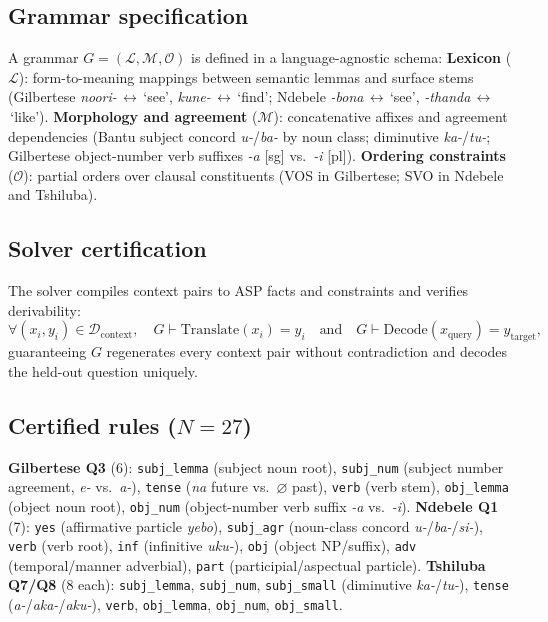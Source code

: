 \documentclass{article}
\begin{document}
\subsection{Grammar specification}
A grammar $G = (\mathcal{L}, \mathcal{M}, \mathcal{O})$ is defined in a
language-agnostic schema: \textbf{Lexicon} ($\mathcal{L}$): form-to-meaning
mappings between semantic lemmas and surface stems (Gilbertese
\emph{noori-}\,$\leftrightarrow$\,`see', \emph{kune-}\,$\leftrightarrow$\,`find';
Ndebele \emph{-bona}\,$\leftrightarrow$\,`see',
\emph{-thanda}\,$\leftrightarrow$\,`like').
\textbf{Morphology and agreement} ($\mathcal{M}$): concatenative affixes and
agreement dependencies (Bantu subject concord \emph{u-}/\emph{ba-} by noun
class; diminutive \emph{ka-}/\emph{tu-}; Gilbertese object-number verb
suffixes \emph{-a} [sg] vs.\ \emph{-i} [pl]).
\textbf{Ordering constraints} ($\mathcal{O}$): partial orders over clausal
constituents (VOS in Gilbertese; SVO in Ndebele and Tshiluba).

\subsection{Solver certification}
The solver compiles context pairs to ASP facts and constraints and verifies
derivability:
\begin{equation}
\forall (x_i, y_i) \in \mathcal{D}_{\text{context}},\quad
G \vdash \mathrm{Translate}(x_i) = y_i
\quad\text{and}\quad
G \vdash \mathrm{Decode}(x_{\text{query}}) = y_{\text{target}},
\end{equation}
guaranteeing $G$ regenerates every context pair without contradiction and
decodes the held-out question uniquely.

\subsection{Certified rules ($N=27$)}
\textbf{Gilbertese Q3} (6): \texttt{subj\_lemma} (subject noun root),
\texttt{subj\_num} (subject number agreement, \emph{e-} vs.\ \emph{a-}),
\texttt{tense} (\emph{na} future vs.\ $\varnothing$ past), \texttt{verb}
(verb stem), \texttt{obj\_lemma} (object noun root), \texttt{obj\_num}
(object-number verb suffix \emph{-a} vs.\ \emph{-i}).
\textbf{Ndebele Q1} (7): \texttt{yes} (affirmative particle \emph{yebo}),
\texttt{subj\_agr} (noun-class concord \emph{u-}/\emph{ba-}/\emph{si-}),
\texttt{verb} (verb root), \texttt{inf} (infinitive \emph{uku-}),
\texttt{obj} (object NP/suffix), \texttt{adv} (temporal/manner adverbial),
\texttt{part} (participial/aspectual particle).
\textbf{Tshiluba Q7/Q8} (8 each): \texttt{subj\_lemma}, \texttt{subj\_num},
\texttt{subj\_small} (diminutive \emph{ka-}/\emph{tu-}), \texttt{tense}
(\emph{a-}/\emph{aka-}/\emph{aku-}), \texttt{verb}, \texttt{obj\_lemma},
\texttt{obj\_num}, \texttt{obj\_small}.
\end{document}
